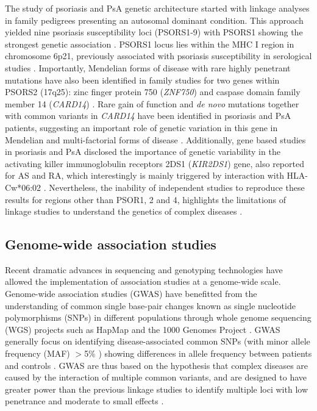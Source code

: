 The study of psoriasis and PsA genetic architecture started with linkage analyses in family pedigrees presenting an autosomal dominant condition. This approach yielded nine psoriasis susceptibility loci (PSORS1-9) with PSORS1 showing the strongest genetic association \parencite{Capon2017, International2003}. PSORS1 locus lies within the MHC I region in chromosome 6p21, previously associated with psoriasis susceptibility in serological studies \parencite{Rusell1972, Tiilikainen1980}. Importantly, Mendelian forms of disease with rare highly penetrant mutations have also been identified in family studies for two genes within PSORS2 (17q25): zinc finger protein 750 (\textit{ZNF750}) and caspase domain family member 14 (\textit{CARD14}) \parencite{Tomfohrde1994,Jordan2012}. Rare gain of function and \textit{de novo} mutations together with common variants in \textit{CARD14} have been identified in psoriasis and PsA patients, suggesting an important role of genetic variation in this gene in Mendelian and multi-factorial forms of disease \parencite {Jordan2012, Tsoi2012}. %
 Additionally, gene based studies in psoriasis and PsA disclosed the importance of genetic variability in the activating killer immunoglobulin receptors 2DS1 (\textit{KIR2DS1}) gene, also reported for AS and RA, which interestingly is mainly triggered by interaction with HLA-Cw*06:02 \parencite{Luszczek2004, Williams2005,Carter2007, Yen2001}.  Nevertheless, the inability of independent studies to reproduce these results for regions other than PSOR1, 2 and 4, highlights the limitations of linkage studies to understand the genetics of complex diseases \parencite{Capon2017}. 



\subsection{Genome-wide association studies}

Recent dramatic advances in sequencing and genotyping technologies have allowed the implementation of association studies at a genome-wide scale. Genome-wide association studies (GWAS) have benefitted from the understanding of common single base-pair changes known as single nucleotide polymorphisms (SNPs) in different populations through whole genome sequencing (WGS) projects such as HapMap \parencite{The international HapMaP Consortium} and the 1000 Genomes Project \parencite{The 1000 Genomes}. GWAS generally focus on identifying disease-associated common SNPs (with minor allele frequency (MAF) ${>}$5\% ) showing differences in allele frequency between patients and controls \parencite{Ku2010}. GWAS are thus based on the hypothesis that complex diseases are caused by the interaction of multiple common variants, and are designed to have greater power than the previous linkage studies to identify multiple loci with low penetrance and moderate to small effects \parencite{Schork2009, Cui2010}. 

